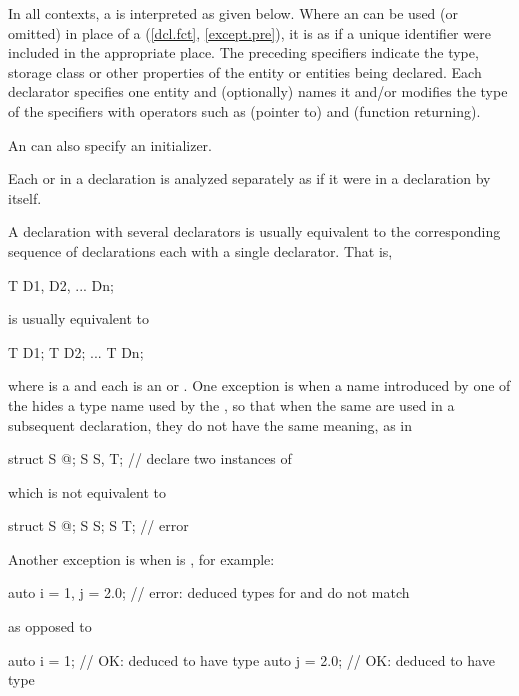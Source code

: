 \pnum
In all contexts, a  is interpreted as given below.
Where an  can be used (or omitted)
in place of a  (\ref{dcl.fct}, \ref{except.pre}),
it is as if a unique identifier were included in
the appropriate place.
The preceding specifiers indicate
the type, storage class or other properties
of the entity or entities being declared.
Each declarator specifies one entity and
(optionally) names it and/or
modifies the type of the specifiers with operators such as
\tcode{*} (pointer to) and \tcode{()} (function returning).
\begin{note}
An  can also specify an initializer.
\end{note}

\pnum
Each  or 
in a declaration is analyzed separately as if it were in a declaration by itself.
\begin{note}
A declaration with several declarators is usually equivalent to the corresponding
sequence of declarations each with a single declarator. That is,
\begin{codeblock}
T D1, D2, ... Dn;
\end{codeblock}
is usually equivalent to
\begin{codeblock}
T D1; T D2; ... T Dn;
\end{codeblock}
where  is a 
and each  is
an  or .
One exception is when a name introduced by one of the
 hides a type name used by the
, so that when the same
 are used in a subsequent declaration,
they do not have the same meaning, as in
\begin{codeblock}
struct S { @\commentellip@ };
S S, T;                 // declare two instances of 
\end{codeblock}
which is not equivalent to
\begin{codeblock}
struct S { @\commentellip@ };
S S;
S T;                    // error
\end{codeblock}
Another exception is when  is ,
for example:
\begin{codeblock}
auto i = 1, j = 2.0;    // error: deduced types for  and  do not match
\end{codeblock}
as opposed to
\begin{codeblock}
auto i = 1;             // OK:  deduced to have type 
auto j = 2.0;           // OK:  deduced to have type 
\end{codeblock}
\end{note}

